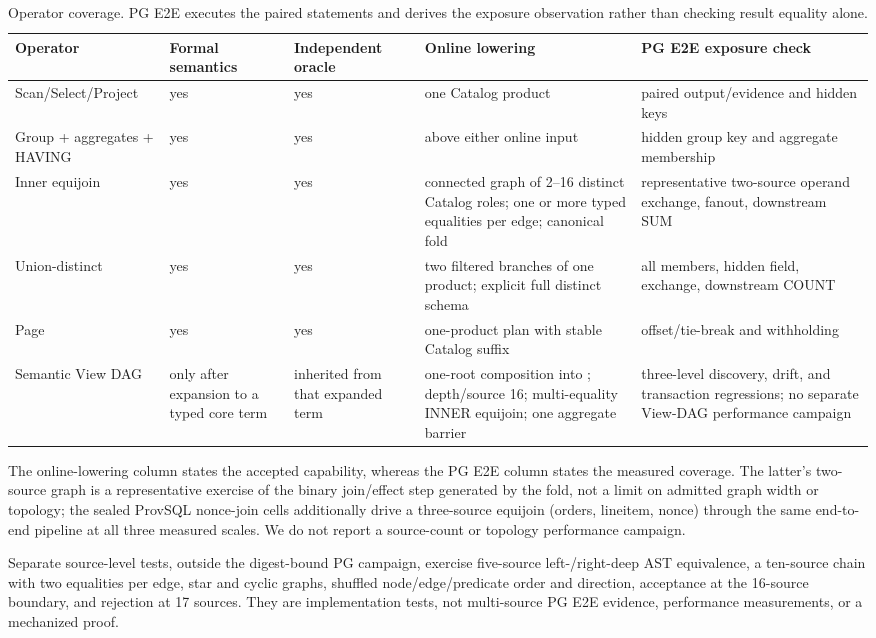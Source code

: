 \documentclass[journal,onecolumn]{IEEEtran}
\newcommand{\code}[1]{\texttt{\detokenize{#1}}}
\begin{document}
\begin{table}[h]
\centering
\caption{Operator coverage. PG E2E executes the paired statements and derives
the exposure observation rather than checking result equality alone.}
\label{tab:coverage-supp}
\small
\setlength{\tabcolsep}{3pt}
\begin{tabular}{L{0.18\textwidth}L{0.14\textwidth}L{0.16\textwidth}L{0.25\textwidth}L{0.20\textwidth}}
\toprule
Operator & Formal semantics & Independent oracle & Online lowering & PG E2E exposure check \\
\midrule
Scan/Select/Project & yes & yes & one Catalog product & paired output/evidence and hidden keys \\
Group + aggregates + HAVING & yes & yes & above either online input & hidden group key and aggregate membership \\
Inner equijoin & yes & yes & connected graph of 2--16 distinct Catalog roles; one or more typed equalities per edge; canonical fold & representative two-source operand exchange, fanout, downstream SUM \\
Union-distinct & yes & yes & two filtered branches of one product; explicit full distinct schema & all members, hidden field, exchange, downstream COUNT \\
Page & yes & yes & one-product plan with stable Catalog suffix & offset/tie-break and withholding \\
Semantic View DAG & only after expansion to a typed core term & inherited from that expanded term & one-root composition into \code{CompileRelational}; depth/source 16; multi-equality INNER equijoin; one aggregate barrier & three-level discovery, drift, and transaction regressions; no separate View-DAG performance campaign \\
\bottomrule
\end{tabular}
\end{table}

The online-lowering column states the accepted capability, whereas the PG E2E
column states the measured coverage.  The latter's two-source graph is a
representative exercise of the binary join/effect step generated by the fold,
not a limit on admitted graph width or topology; the sealed ProvSQL
nonce-join cells additionally drive a three-source equijoin (orders,
lineitem, nonce) through the same end-to-end pipeline at all three measured
scales.  We do not report a source-count or topology performance campaign.

Separate source-level tests, outside the digest-bound PG campaign, exercise
five-source left-/right-deep AST equivalence, a ten-source chain with two
equalities per edge, star and cyclic graphs, shuffled node/edge/predicate order
and direction, acceptance at the 16-source boundary, and rejection at 17
sources.  They are implementation tests, not
multi-source PG E2E evidence, performance measurements, or a mechanized proof.
\end{document}
